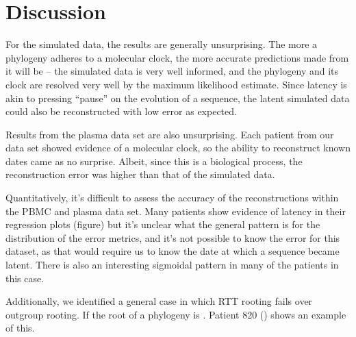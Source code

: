 \section{Discussion} \label{sec:discuss}
For the simulated data, the results are generally unsurprising. The more a phylogeny adheres to a molecular clock, the more accurate predictions made from it will be -- the simulated data is very well informed, and the phylogeny and its clock are resolved very well by the maximum likelihood estimate. Since latency is akin to pressing ``pause'' on the evolution of a sequence, the latent simulated data could also be reconstructed with low error as expected.

Results from the plasma data set are also unsurprising. Each patient from our data set showed evidence of a molecular clock, so the ability to reconstruct known dates came as no surprise. Albeit, since this is a biological process, the reconstruction error was higher than that of the simulated data.

Quantitatively, it's difficult to assess the accuracy of the reconstructions within the PBMC and plasma data set. Many patients show evidence of latency in their regression plots (figure) but it's unclear what the general pattern is for the distribution of the error metrics, and it's not possible to know the error for this dataset, as that would require us to know the date at which a sequence became latent. There is also an interesting sigmoidal pattern in many of the patients in this case.


Additionally, we identified a general case in which RTT rooting fails over outgroup rooting. If the root of a phylogeny is . Patient 820 () shows an example of this. 


